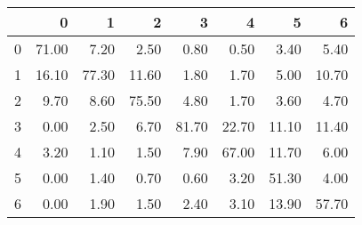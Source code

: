 \begin{table}[ht]
\centering
\begin{tabular}{rrrrrrrr}
  \hline
 & 0 & 1 & 2 & 3 & 4 & 5 & 6 \\ 
  \hline
0 & 71.00 & 7.20 & 2.50 & 0.80 & 0.50 & 3.40 & 5.40 \\ 
  1 & 16.10 & 77.30 & 11.60 & 1.80 & 1.70 & 5.00 & 10.70 \\ 
  2 & 9.70 & 8.60 & 75.50 & 4.80 & 1.70 & 3.60 & 4.70 \\ 
  3 & 0.00 & 2.50 & 6.70 & 81.70 & 22.70 & 11.10 & 11.40 \\ 
  4 & 3.20 & 1.10 & 1.50 & 7.90 & 67.00 & 11.70 & 6.00 \\ 
  5 & 0.00 & 1.40 & 0.70 & 0.60 & 3.20 & 51.30 & 4.00 \\ 
  6 & 0.00 & 1.90 & 1.50 & 2.40 & 3.10 & 13.90 & 57.70 \\ 
   \hline
\end{tabular}
\end{table}
